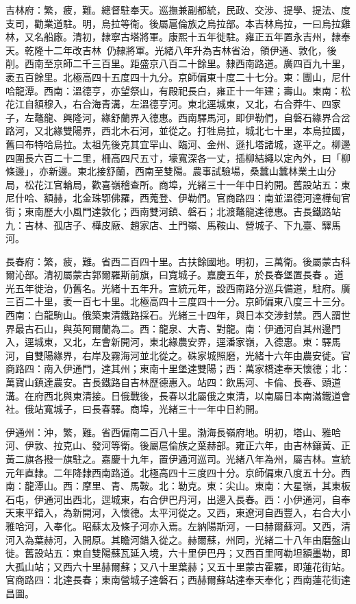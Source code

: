 \begin{pinyinscope}
吉林府：繁，疲，難。總督駐奉天。巡撫兼副都統，民政、交涉、提學、提法、度支司，勸業道駐。明，烏拉等衛。後屬扈倫族之烏拉部。本吉林烏拉，一曰烏拉雞林，又名船廠。清初，隸寧古塔將軍。康熙十五年徙駐。雍正五年置永吉州，隸奉天。乾隆十二年改吉林，仍隸將軍。光緒八年升為吉林省治，領伊通、敦化，後削。西南至京師二千三百里。距盛京八百二十餘里。隸西南路道。廣四百九十里，袤五百餘里。北極高四十五度四十九分。京師偏東十度二十七分。東：團山，尼什哈龍潭。西南：溫德亨，亦望祭山，有殿祀長白，雍正十一年建；壽山。東南：松花江自額穆入，右合海青溝，左溫德亨河。東北逕城東，又北，右合莽牛、四家子，左鼇龍、興隆河，緣舒蘭界入德惠。西南驛馬河，即伊勒們，自磐石緣界合岔路河，又北緣雙陽界，西北木石河，並從之。打牲烏拉，城北七十里，本烏拉國，舊曰布特哈烏拉。太祖先後克其宜罕山、臨河、金州、遜扎塔諸城，遂平之。柳邊四圍長六百二十二里，柵高四尺五寸，壕寬深各一丈，插柳結繩以定內外，曰「柳條邊」，亦新邊。東北接舒蘭，西南至雙陽。農事試驗場，桑蠶山蠶林業土山分局，松花江官輪局，歡喜嶺稽查所。商埠，光緒三十一年中日約開。舊設站五：東尼什哈、額赫，北金珠鄂佛羅，西蒐登、伊勒們。官商路四：南並溫德河達樺甸官街；東南歷大小風門達敦化；西南雙河鎮、磐石；北渡鼇龍達德惠。吉長鐵路站九：吉林、孤店子、樺皮廠、趙家店、土門嶺、馬鞍山、營城子、下九臺、驛馬河。

長春府：繁，疲，難。省西二百四十里。古扶餘國地。明初，三萬衛。後屬蒙古科爾沁部。清初屬蒙古郭爾羅斯前旗，曰寬城子。嘉慶五年，於長春堡置長春。道光五年徙治，仍舊名。光緒十五年升。宣統元年，設西南路分巡兵備道，駐府。廣三百二十里，袤一百七十里。北極高四十三度四十一分。京師偏東八度三十三分。西南：白龍駒山。俄築東清鐵路採石。光緒三十四年，與日本交涉封禁。西人謂世界最古石山，與英阿爾蘭為二。西：龍泉、大青、對龍。南：伊通河自其州邊門入，逕城東，又北，左會新開河，東北緣農安界，逕潘家嶺，入德惠。東：驛馬河，自雙陽緣界，右岸及霧海河並北從之。硃家城照磨，光緒十六年由農安徙。官商路四：南入伊通門，達其州；東南十里堡達雙陽；西：萬家橋達奉天懷德；北：萬寶山鎮達農安。吉長鐵路自吉林歷德惠入。站四：飲馬河、卡倫、長春、頭道溝。在府西北與東清接。日俄戰後，長春以北屬俄之東清，以南屬日本南滿鐵道會社。俄站寬城子，曰長春驛。商埠，光緒三十一年中日約開。

伊通州：沖，繁，難。省西偏南二百八十里。渤海長嶺府地。明初，塔山、雅哈河、伊敦、拉克山、發河等衛。後屬扈倫族之葉赫部。雍正六年，由吉林鑲黃、正黃二旗各撥一旗駐之。嘉慶十九年，置伊通河巡司。光緒八年為州，屬吉林。宣統元年直隸。二年降隸西南路道。北極高四十三度四十分。京師偏東八度五十分。西南：龍潭山。西：摩里、青、馬鞍。北：勒克。東：尖山。東南：大星嶺，其東板石屯，伊通河出西北，逕城東，右合伊巴丹河，出邊入長春。西：小伊通河，自奉天東平錯入，為新開河，入懷德。太平河從之。又西，東遼河自西豐入，右合大小雅哈河，入奉化。昭蘇太及條子河亦入焉。左納陽斯河，一曰赫爾蘇河。又西，清河入為葉赫河，入開原。其瞻河錯入從之。赫爾蘇，州同，光緒二十八年由磨盤山徙。舊設站五：東自雙陽蘇瓦延入境，六十里伊巴丹；又西百里阿勒坦額墨勒，即大孤山站；又西六十里赫爾蘇；又八十里葉赫；又五十里蒙古霍羅，即蓮花街站。官商路四：北達長春；東南營城子達磐石；西赫爾蘇站達奉天奉化；西南蓮花街達昌圖。


\end{pinyinscope}
